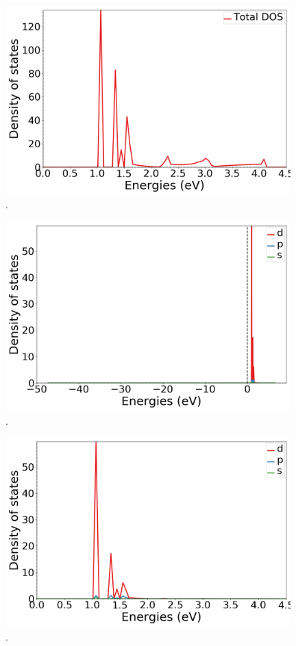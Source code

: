 \documentclass{article}
\begin{document}
  \begin{figure}[H]
      \centering
      \includegraphics[width = 11cm]{../fig/Y_k4_TDOS_2.png}
      \caption{. }
      \label{fig:Y_k4_TDOS_2.png}
  \end{figure}

  \begin{figure}[H]
      \centering
      \includegraphics[width = 11cm]{../fig/Y_k4_LDOS25_1.png}
      \caption{. }
      \label{fig:Y_k4_LDOS25_1.png}
  \end{figure}

  \begin{figure}[H]
      \centering
      \includegraphics[width = 11cm]{../fig/Y_k4_LDOS25_2.png}
      \caption{. }
      \label{fig:Y_k4_LDOS25_2.png}
  \end{figure}
\end{document}
